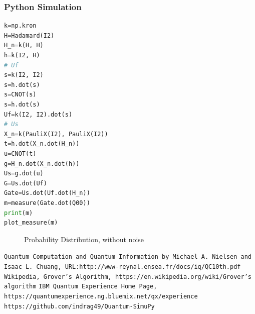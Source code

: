 \documentclass{article}
\begin{document}
\subsubsection{Python Simulation}
\begin{lstlisting}[frame=single, language=Python]
k=np.kron
H=Hadamard(I2)
H_n=k(H, H)
h=k(I2, H)
# Uf
s=k(I2, I2)
s=h.dot(s)
s=CNOT(s)
s=h.dot(s)
Uf=k(I2, I2).dot(s)
# Us
X_n=k(PauliX(I2), PauliX(I2))
t=h.dot(X_n.dot(H_n))
u=CNOT(t)
g=H_n.dot(X_n.dot(h))
Us=g.dot(u)
G=Us.dot(Uf)
Gate=Us.dot(Uf.dot(H_n))
m=measure(Gate.dot(Q00))
print(m)
plot_measure(m)
\end{lstlisting}
\begin{figure}[H]
\centering 
\noindent{}%
\caption{Probability Distribution, without noise}
\end{figure}
\begin{thebibliography}{9}
\texttt{Quantum Computation and Quantum Information by Michael A. Nielsen and Isaac L. Chuang, URL:http://www-reynal.ensea.fr/docs/iq/QC10th.pdf}
\texttt{Wikipedia, Grover's Algorithm, https://en.wikipedia.org/wiki/Grover's algorithm}
\texttt{IBM Quantum Experience Home Page, https://quantumexperience.ng.bluemix.net/qx/experience}
\texttt{https://github.com/indrag49/Quantum-SimuPy}
\end{thebibliography}
\end{document}
